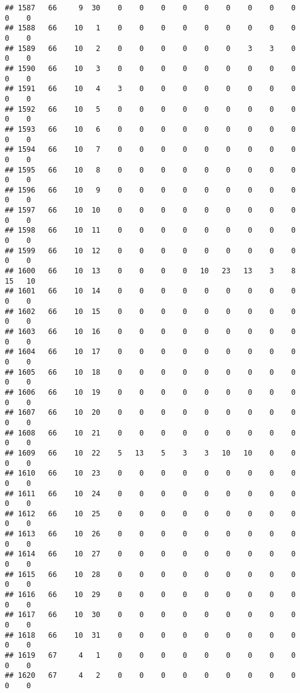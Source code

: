 \documentclass[]{article}
\begin{document}
\begin{verbatim}
## 1587   66     9  30    0    0    0    0    0    0    0    0    0    0    0
## 1588   66    10   1    0    0    0    0    0    0    0    0    0    0    0
## 1589   66    10   2    0    0    0    0    0    0    3    3    0    0    0
## 1590   66    10   3    0    0    0    0    0    0    0    0    0    0    0
## 1591   66    10   4    3    0    0    0    0    0    0    0    0    0    0
## 1592   66    10   5    0    0    0    0    0    0    0    0    0    0    0
## 1593   66    10   6    0    0    0    0    0    0    0    0    0    0    0
## 1594   66    10   7    0    0    0    0    0    0    0    0    0    0    0
## 1595   66    10   8    0    0    0    0    0    0    0    0    0    0    0
## 1596   66    10   9    0    0    0    0    0    0    0    0    0    0    0
## 1597   66    10  10    0    0    0    0    0    0    0    0    0    0    0
## 1598   66    10  11    0    0    0    0    0    0    0    0    0    0    0
## 1599   66    10  12    0    0    0    0    0    0    0    0    0    0    0
## 1600   66    10  13    0    0    0    0   10   23   13    3    8   15   10
## 1601   66    10  14    0    0    0    0    0    0    0    0    0    0    0
## 1602   66    10  15    0    0    0    0    0    0    0    0    0    0    0
## 1603   66    10  16    0    0    0    0    0    0    0    0    0    0    0
## 1604   66    10  17    0    0    0    0    0    0    0    0    0    0    0
## 1605   66    10  18    0    0    0    0    0    0    0    0    0    0    0
## 1606   66    10  19    0    0    0    0    0    0    0    0    0    0    0
## 1607   66    10  20    0    0    0    0    0    0    0    0    0    0    0
## 1608   66    10  21    0    0    0    0    0    0    0    0    0    0    0
## 1609   66    10  22    5   13    5    3    3   10   10    0    0    0    0
## 1610   66    10  23    0    0    0    0    0    0    0    0    0    0    0
## 1611   66    10  24    0    0    0    0    0    0    0    0    0    0    0
## 1612   66    10  25    0    0    0    0    0    0    0    0    0    0    0
## 1613   66    10  26    0    0    0    0    0    0    0    0    0    0    0
## 1614   66    10  27    0    0    0    0    0    0    0    0    0    0    0
## 1615   66    10  28    0    0    0    0    0    0    0    0    0    0    0
## 1616   66    10  29    0    0    0    0    0    0    0    0    0    0    0
## 1617   66    10  30    0    0    0    0    0    0    0    0    0    0    0
## 1618   66    10  31    0    0    0    0    0    0    0    0    0    0    0
## 1619   67     4   1    0    0    0    0    0    0    0    0    0    0    0
## 1620   67     4   2    0    0    0    0    0    0    0    0    0    0    0

\end{verbatim}
\end{document}
